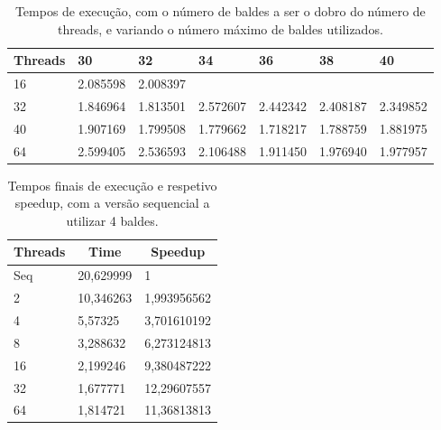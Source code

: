 \documentclass[a4paper]{report}
\begin{document}
\begin{table}[h]
    \centering
    \begin{tabular}{|l|l|l|l|l|l|l|}
        \hline
        Threads & 30       & 32       & 34       & 36       & 38       & 40       \\ \hline
        16      & 2.085598 & 2.008397 &          &          &          &          \\ \hline
        32      & 1.846964 & 1.813501 & 2.572607 & 2.442342 & 2.408187 & 2.349852 \\ \hline
        40      & 1.907169 & 1.799508 & 1.779662 & 1.718217 & 1.788759 & 1.881975 \\ \hline
        64      & 2.599405 & 2.536593 & 2.106488 & 1.911450 & 1.976940 & 1.977957 \\ \hline
    \end{tabular}
    \caption{\label{tab:cutoff}Tempos de execução, com o número de baldes a ser o
    dobro do número de threads, e variando o número máximo de baldes
    utilizados.}
\end{table}

\begin{table}[h]
    \centering
    \begin{tabular}{|l|l|l|}
        \hline
        \multicolumn{1}{|c|}{Threads} & \multicolumn{1}{c|}{Time} & \multicolumn{1}{c|}{Speedup} \\ \hline
        Seq                           & 20,629999                 & 1                            \\ \hline
        2                             & 10,346263                 & 1,993956562                  \\ \hline
        4                             & 5,57325                   & 3,701610192                  \\ \hline
        8                             & 3,288632                  & 6,273124813                  \\ \hline
        16                            & 2,199246                  & 9,380487222                  \\ \hline
        32                            & 1,677771                  & 12,29607557                  \\ \hline
        64                            & 1,814721                  & 11,36813813                  \\ \hline
    \end{tabular}
    \caption{\label{tab:final}Tempos finais de execução e respetivo speedup, com a
    versão sequencial a utilizar 4 baldes.}
\end{table}
\end{document}
